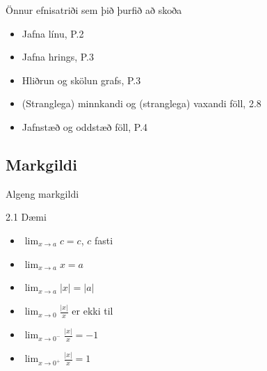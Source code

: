 \documentclass[icelandic,a4paper,12pt]{article}
\begin{document}



\begin{frame}{Önnur efnisatriði sem þið þurfið að skoða}

\begin{itemize}
\item Jafna línu, P.2
\item Jafna hrings, P.3
 \item Hliðrun og skölun grafs, P.3
 \item (Stranglega) minnkandi og (stranglega) vaxandi föll, 2.8
 \item Jafnstæð og oddstæð föll, P.4
\end{itemize}

 
\end{frame}

\date{3.~september 2012}

\begin{frame}
	\maketitle
\end{frame}

\subsection*{Markgildi}

\begin{frame}{Algeng markgildi}
\begin{block}{2.1 Dæmi}
	\begin{itemize}
	\item $\lim_{x \to a} c = c$, $c$ fasti
	\pause
	\item $\lim_{x \to a} x = a$
	\item $\lim_{x \to a} |x| = |a|$
	\pause
	\item $\lim_{x \to 0} \frac{|x|}{x}$ er ekki til
	\pause
	\item $\lim_{x \to 0^-} \frac{|x|}{x} = -1$
	\item $\lim_{x \to 0^+} \frac{|x|}{x} = 1$
	\end{itemize}
\end{block}
\end{frame}
\end{document}
